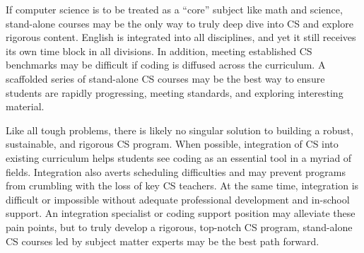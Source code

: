 If computer science is to be treated as a ``core'' subject like math and science, stand-alone courses may be the only way to truly deep dive into CS and explore rigorous content. English is integrated into all disciplines, and yet it still receives its own time block in all divisions. In addition, meeting established CS benchmarks may be difficult if coding is diffused across the curriculum. A scaffolded series of stand-alone CS courses may be the best way to ensure students are rapidly progressing, meeting standards, and exploring interesting material.\par
Like all tough problems, there is likely no singular solution to building a robust, sustainable, and rigorous CS program. When possible, integration of CS into existing curriculum helps students see coding as an essential tool in a myriad of fields. Integration also averts scheduling difficulties and may prevent programs from crumbling with the loss of key CS teachers. At the same time, integration is difficult or impossible without adequate professional development and in-school support. An integration specialist or coding support position may alleviate these pain points, but to truly develop a rigorous, top-notch CS program, stand-alone CS courses led by subject matter experts may be the best path forward.\par

